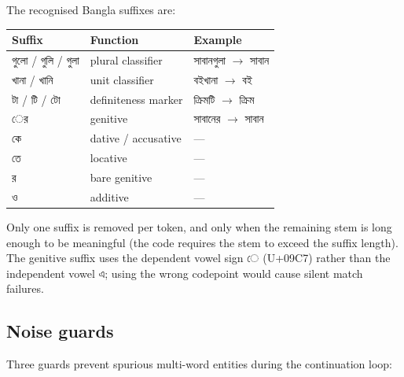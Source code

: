 \documentclass[11pt]{article}
\newcommand{\bn}[1]{{\bnfont #1}}
\begin{document}
The recognised Bangla suffixes are:

\begin{center}
\begin{tabular}{@{}lll@{}}
\toprule
\textbf{Suffix} & \textbf{Function} & \textbf{Example} \\
\midrule
\bn{গুলো} / \bn{গুলি} / \bn{গুলা} & plural classifier   & \bn{সাবানগুলা} $\rightarrow$ \bn{সাবান} \\
\bn{খানা} / \bn{খানি}             & unit classifier     & \bn{বইখানা} $\rightarrow$ \bn{বই} \\
\bn{টা} / \bn{টি} / \bn{টো}       & definiteness marker & \bn{ক্রিমটি} $\rightarrow$ \bn{ক্রিম} \\
\bn{ের}                            & genitive            & \bn{সাবানের} $\rightarrow$ \bn{সাবান} \\
\bn{কে}                            & dative / accusative & --- \\
\bn{তে}                            & locative            & --- \\
\bn{র}                             & bare genitive       & --- \\
\bn{ও}                             & additive            & --- \\
\bottomrule
\end{tabular}
\end{center}

\noindent Only one suffix is removed per token, and only when the remaining stem
is long enough to be meaningful (the code requires the stem to exceed the suffix
length). The genitive suffix uses the dependent vowel sign \bn{ে} (U+09C7)
rather than the independent vowel \bn{এ}; using the wrong codepoint would cause
silent match failures.

\subsection{Noise guards}
\label{sec:guards}
Three guards prevent spurious multi-word entities during the continuation loop:
\end{document}
